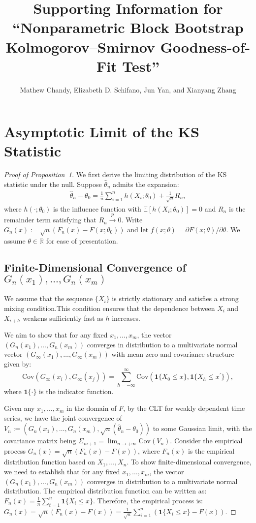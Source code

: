 \documentclass[12pt]{article}
\title{Supporting Information for
  ``Nonparametric Block Bootstrap Kolmogorov--Smirnov Goodness-of-Fit
  Test''}
\author{Mathew Chandy, Elizabeth D. Schifano, Jun Yan, and Xianyang
  Zhang}
\begin{document}
\maketitle


\section{Asymptotic Limit of the KS Statistic}

\begin{proof}[Proof of Proposition~1]
We first derive the limiting distribution of the KS statistic under the null. 
Suppose $\hat{\theta}_n$ admits the expansion:
\begin{align}\label{eq-expan}
\hat{\theta}_n-\theta_0 = \frac{1}{n}\sum^{n}_{i=1}h(X_i;\theta_0) + 
\frac{1}{\sqrt{n}}R_n,    
\end{align}
where $h(\cdot;\theta_0)$ is the influence function with 
$\mathbb{E}[h(X_i;\theta_0)]=0$ and $R_n$ is the remainder term satisfying that
$R_n\overset{p}{\rightarrow} 0.$ Write $G_n(x):=\sqrt{n}(F_n(x) - 
F(x; \theta_0))$ 
and let $f(x;\theta)=\partial F(x;\theta)/\partial \theta$. We assume 
$\theta \in \mathbb{R}$ for ease of presentation.

\subsection{Finite-Dimensional Convergence of $G_n(x_1),\dots,G_n(x_m)$}

We assume that the sequence \(\{X_i\}\) is strictly stationary and satisfies a 
strong mixing condition.This condition ensures that the dependence between 
\(X_i\) and \(X_{i+h}\) weakens sufficiently fast as \(h\) increases.

We aim to show that for any fixed \( x_1, \ldots, x_m \), the vector \( (G_n(x_1), \ldots, G_n(x_m)) \) converges in distribution to a multivariate normal vector \( (G_{\infty}(x_1), \ldots, G_{\infty}(x_m)) \) with mean zero and covariance structure given by:
\[
\text{Cov}(G_{\infty}(x_i), G_{\infty}(x_j)) = \sum_{h=-\infty}^{\infty} \text{Cov}(\mathbf{1}\{X_0 \leq x\}, \mathbf{1}\{X_h \leq x^{\prime}\}),
\]
where $ \mathbf{1}\{\cdot\}$ is the indicator
function.


Given any $x_1,\dots,x_m$ in the domain of $F$, by the CLT for weakly dependent 
time series, we have the joint convergence of 
$V_n:=(G_n(x_1),\dots,G_n(x_m),\sqrt{n}(\hat{\theta}_n-\theta_0))$
to some Gaussian limit, with the covariance matrix being 
$\Sigma_{m+1}=\lim_{n\rightarrow+\infty}\text{Cov}(V_n)$.
Consider the empirical process $ G_n(x) = \sqrt{n} (F_n(x) - F(x)) $, where 
$ F_n(x) $ is the empirical distribution function based on $ X_1, \ldots, 
X_n $. To show finite-dimensional convergence, we need to establish that for 
any fixed $ x_1, \ldots, x_m $, the vector $ (G_n(x_1), \ldots, G_n(x_m)) $ 
converges in distribution to a multivariate normal distribution.
The 
empirical distribution function can be written as:
$
F_n(x) = \frac{1}{n} \sum_{t=1}^n \mathbf{1}\{X_i \leq x\}.
$
Therefore, the empirical process is:
$
G_n(x) = \sqrt{n} (F_n(x) - F(x)) = \frac{1}{\sqrt{n}} \sum_{i=1}^n 
(\mathbf{1}\{X_i \leq x\} - 
F(x)).
$ 


\end{proof}
\end{document}
